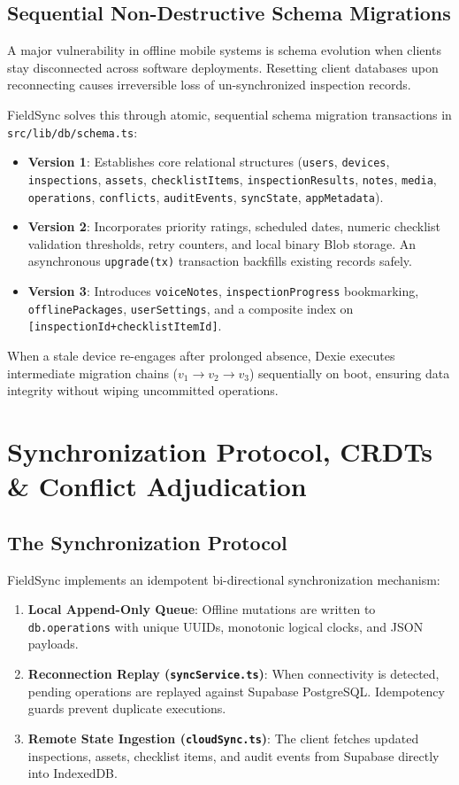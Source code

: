 \documentclass[conference]{IEEEtran}
\begin{document}
\subsection{Sequential Non-Destructive Schema Migrations}
A major vulnerability in offline mobile systems is schema evolution when clients stay disconnected across software deployments. Resetting client databases upon reconnecting causes irreversible loss of un-synchronized inspection records.

FieldSync solves this through atomic, sequential schema migration transactions in \texttt{src/lib/db/schema.ts}:
\begin{itemize}\setlength{\itemsep}{1pt}
    \item \textbf{Version 1}: Establishes core relational structures (\texttt{users}, \texttt{devices}, \texttt{inspections}, \texttt{assets}, \texttt{checklistItems}, \texttt{inspectionResults}, \texttt{notes}, \texttt{media}, \texttt{operations}, \texttt{conflicts}, \texttt{auditEvents}, \texttt{syncState}, \texttt{appMetadata}).
    \item \textbf{Version 2}: Incorporates priority ratings, scheduled dates, numeric checklist validation thresholds, retry counters, and local binary Blob storage. An asynchronous \texttt{upgrade(tx)} transaction backfills existing records safely.
    \item \textbf{Version 3}: Introduces \texttt{voiceNotes}, \texttt{inspectionProgress} bookmarking, \texttt{offlinePackages}, \texttt{userSettings}, and a composite index on \texttt{[inspectionId+checklistItemId]}.
\end{itemize}
When a stale device re-engages after prolonged absence, Dexie executes intermediate migration chains ($v_1 \rightarrow v_2 \rightarrow v_3$) sequentially on boot, ensuring data integrity without wiping uncommitted operations.

\section{Synchronization Protocol, CRDTs \& Conflict Adjudication}

\subsection{The Synchronization Protocol}
FieldSync implements an idempotent bi-directional synchronization mechanism:
\begin{enumerate}\setlength{\itemsep}{1pt}
    \item \textbf{Local Append-Only Queue}: Offline mutations are written to \texttt{db.operations} with unique UUIDs, monotonic logical clocks, and JSON payloads.
    \item \textbf{Reconnection Replay (\texttt{syncService.ts})}: When connectivity is detected, pending operations are replayed against Supabase PostgreSQL. Idempotency guards prevent duplicate executions.
    \item \textbf{Remote State Ingestion (\texttt{cloudSync.ts})}: The client fetches updated inspections, assets, checklist items, and audit events from Supabase directly into IndexedDB.
\end{enumerate}
\end{document}
